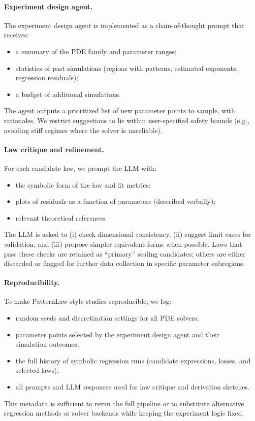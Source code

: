 \documentclass{article}
\theoremstyle{plain}
\theoremstyle{definition}
\theoremstyle{remark}
\begin{document}
\paragraph{Experiment design agent.}
The experiment design agent is implemented as a chain-of-thought prompt that receives:
\begin{itemize}
    \item a summary of the PDE family and parameter ranges;
    \item statistics of past simulations (regions with patterns, estimated exponents, regression residuals);
    \item a budget of additional simulations.
\end{itemize}
The agent outputs a prioritized list of new parameter points to sample, with rationales. We restrict suggestions to lie within user-specified safety bounds (e.g., avoiding stiff regimes where the solver is unreliable).

\paragraph{Law critique and refinement.}
For each candidate law, we prompt the LLM with:
\begin{itemize}
    \item the symbolic form of the law and fit metrics;
    \item plots of residuals as a function of parameters (described verbally);
    \item relevant theoretical references.
\end{itemize}
The LLM is asked to (i) check dimensional consistency, (ii) suggest limit cases for validation, and (iii) propose simpler equivalent
forms when possible. Laws that pass these checks are retained as ``primary'' scaling candidates; others are either discarded or flagged for further data collection in specific parameter subregions.

\paragraph{Reproducibility.}
To make PatternLaw-style studies reproducible, we log:
\begin{itemize}
    \item random seeds and discretization settings for all PDE solvers;
    \item parameter points selected by the experiment design agent and their simulation outcomes;
    \item the full history of symbolic regression runs (candidate expressions, losses, and selected laws);
    \item all prompts and LLM responses used for law critique and derivation sketches.
\end{itemize}
This metadata is sufficient to rerun the full pipeline or to substitute alternative regression methods or solver backends while keeping the experiment logic fixed.
\end{document}
